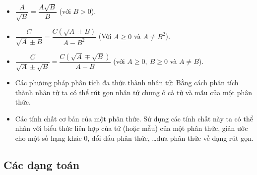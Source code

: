 \begin{enumerate}[\bfseries 1)]
\begin{itemize}
		\item $ \dfrac{A}{\sqrt B} = \dfrac{A\sqrt B}{B} $ (với $ B > 0 $).
		\item $ \dfrac{C}{\sqrt A \pm B} = \dfrac{C(\sqrt A \pm B)}{A- B^2} $ (Với $ A\ge 0 $ và $ A \ne B^2 $).
		\item $ \dfrac{C}{\sqrt A \pm \sqrt B} = \dfrac{C(\sqrt A \mp \sqrt B )}{A-B}  $ (với $ A\ge 0, \ B \ge 0 $ và $ A\ne B $).
		\item  Các phương pháp phân tích đa thức thành nhân tử: Bằng cách phân tích thành nhân tử ta có thể rút gọn nhân tử chung ở cả tử và mẫu của một phân thức.
		\item Các tính chất cơ bản của một phân thức. Sử dụng các tính chất này ta có thể nhân với biểu thức liên hợp của tử 
		(hoặc mẫu) của một phân thức, giản ước cho một số hạng khác 0, đổi dấu phân thức, \ldots đưa phân thức về dạng rút gọn.
	\end{itemize}
\end{enumerate}
      
     
\subsection{Các dạng toán}

